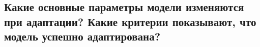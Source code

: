 

\subsection{Какие основные параметры модели изменяются при адаптации? Какие критерии показывают, что модель успешно адаптирована?}

